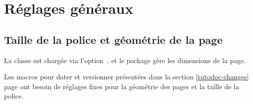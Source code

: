 \documentclass{tutodoc}
\begin{document}
\section{Réglages généraux}

\subsection{Taille de la police et géométrie de la page}

La classe  est chargée via l'option \,, et le package  gère les dimensions de la page.


\begin{tdocwarn}
	Les macros pour dater et versionner présentées dans la section \ref{tutodoc-changes} page \pageref{tutodoc-changes} ont besoin de réglages fixes pour la géométrie des pages et la taille de la police.
\end{tdocwarn}
\end{document}
